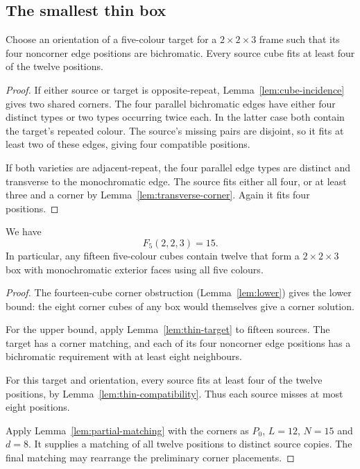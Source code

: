 \subsection{The smallest thin box}

\begin{lemma}\label{lem:thin-compatibility}
Choose an orientation of a five-colour target for a $2\times2\times3$
frame such that its four noncorner edge positions are bichromatic.
Every source cube fits at least four of the twelve positions.
\end{lemma}

\begin{proof}
If either source or target is opposite-repeat,
Lemma~\ref{lem:cube-incidence} gives two shared corners.
The four parallel bichromatic edges have either four distinct types or
two types occurring twice each. In the latter case both contain the
target's repeated colour. The source's missing pairs are disjoint, so
it fits at least two of these edges, giving four compatible positions.

If both varieties are adjacent-repeat, the four parallel edge types are
distinct and transverse to the monochromatic edge. The source fits either
all four, or at least three and a corner by
Lemma~\ref{lem:transverse-corner}. Again it fits four positions.
\end{proof}

\begin{theorem}\label{thm:223}
We have
\[
 F_5(2,2,3)=15.
\]
In particular, any fifteen five-colour cubes contain twelve that form a
$2\times2\times3$ box with monochromatic exterior faces using all five
colours.
\end{theorem}

\begin{proof}
The fourteen-cube corner obstruction (Lemma~\ref{lem:lower}) gives the lower bound: the eight
corner cubes of any box would themselves give a corner solution.

For the upper bound, apply Lemma~\ref{lem:thin-target} to fifteen sources.
The target has a corner matching, and each of its four noncorner edge
positions has a bichromatic requirement with at least eight neighbours.

For this target and orientation, every source fits at least
four of the twelve positions, by Lemma~\ref{lem:thin-compatibility}.
Thus each source misses at most eight positions.

Apply Lemma~\ref{lem:partial-matching} with the corners as $P_0$,
$L=12$, $N=15$ and $d=8$. It supplies a matching of all twelve positions
to distinct source copies. The final matching may rearrange the preliminary
corner placements.
\end{proof}

